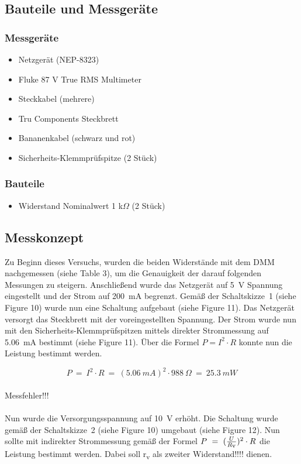 \documentclass[a4paper,12pt]{article}
\begin{document}
\subsection{Bauteile und Messgeräte}
\subsubsection*{Messgeräte}
\begin{itemize}
\item Netzgerät (NEP-8323)
\item Fluke 87 V True RMS Multimeter
\item Steckkabel (mehrere)
\item Tru Components Steckbrett
\item Bananenkabel (schwarz und rot)
\item Sicherheits-Klemmprüfspitze (2 Stück)
\end{itemize}

\subsubsection*{Bauteile}
\begin{itemize}
\item Widerstand Nominalwert 1 k$\Omega$ (2 Stück)
\end{itemize}





\subsection{Messkonzept}
Zu Beginn dieses Versuchs, wurden die beiden Widerstände mit dem DMM nachgemessen (siehe Table 3), um die Genauigkeit der darauf folgenden Messungen zu steigern. Anschließend wurde das Netzgerät auf 5~V Spannung eingestellt und der Strom auf 200~mA begrenzt. Gemäß der Schaltskizze~1 (siehe Figure 10) wurde nun eine Schaltung aufgebaut (siehe Figure 11). Das Netzgerät versorgt das Steckbrett mit der voreingestellten Spannung. Der Strom wurde nun mit den Sicherheits-Klemmprüfspitzen mittels direkter Strommessung auf 5.06~mA bestimmt (siehe Figure 11). Über die Formel \(P = I^2 \cdot R \) konnte nun die Leistung bestimmt werden.

\[
P ~=~ I^2 \cdot R ~=~ (5.06~mA)^2 \cdot 988~\Omega ~=~ 25.3~mW
\]\\

\noindent Messfehler!!!\\\\
Nun wurde die Versorgungsspannung auf 10~V erhöht. Die Schaltung wurde gemäß der Schaltskizze~2 (siehe Figure 10) umgebaut (siehe Figure 12). Nun sollte mit indirekter Strommessung gemäß der Formel \(P ~=~  (\frac{U}{R\textsubscript{v}})^2 \cdot R\) die Leistung bestimmt werden. Dabei soll r\textsubscript{v} als zweiter Widerstand!!!! dienen.
\end{document}

